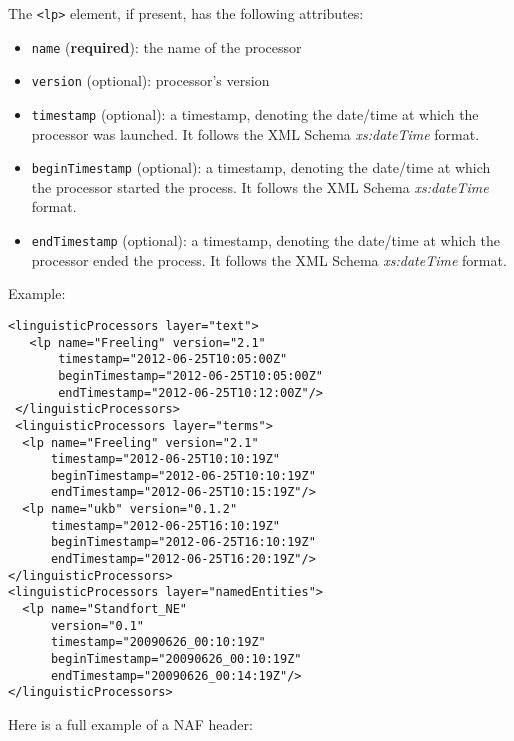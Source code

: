 The \texttt{<lp>} element, if present, has the following attributes:
\begin{itemize}
\item \texttt{name} (\textbf{required}): the name of the processor
\item \texttt{version} (optional): processor's version
\item \texttt{timestamp} (optional): a timestamp, denoting the
  date/time at which the processor was launched. It follows the XML
  Schema \emph{xs:dateTime} format.
\item \texttt{beginTimestamp} (optional): a timestamp, denoting the
  date/time at which the processor started the process. It follows the XML Schema
  \emph{xs:dateTime} format.
\item \texttt{endTimestamp} (optional): a timestamp, denoting the date/time
  at which the processor ended the process. It follows the XML Schema
  \emph{xs:dateTime} format.
\end{itemize}

Example:

\begin{Verbatim}
<linguisticProcessors layer="text">
   <lp name="Freeling" version="2.1"
       timestamp="2012-06-25T10:05:00Z"
       beginTimestamp="2012-06-25T10:05:00Z"
       endTimestamp="2012-06-25T10:12:00Z"/>
 </linguisticProcessors>
 <linguisticProcessors layer="terms">
  <lp name="Freeling" version="2.1"
      timestamp="2012-06-25T10:10:19Z"
      beginTimestamp="2012-06-25T10:10:19Z"
      endTimestamp="2012-06-25T10:15:19Z"/>
  <lp name="ukb" version="0.1.2"
      timestamp="2012-06-25T16:10:19Z"
      beginTimestamp="2012-06-25T16:10:19Z"
      endTimestamp="2012-06-25T16:20:19Z"/>
</linguisticProcessors>
<linguisticProcessors layer="namedEntities">
  <lp name="Standfort_NE"
      version="0.1"
      timestamp="20090626_00:10:19Z"
      beginTimestamp="20090626_00:10:19Z"
      endTimestamp="20090626_00:14:19Z"/>
</linguisticProcessors>
\end{Verbatim}

Here is a full example of a NAF header:


